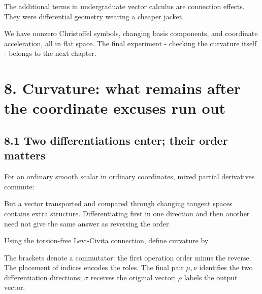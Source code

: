 \documentclass[
  11pt,
  letterpaper,
  oneside,
  openany]{scrbook}
\begin{document}
The additional terms in undergraduate vector calculus are connection
effects. They were differential geometry wearing a cheaper jacket.

We have nonzero Christoffel symbols, changing basis components, and
coordinate acceleration, all in flat space. The final experiment -
checking the curvature itself - belongs to the next chapter.

\hypertarget{chapter-8}{%
\chapter{8. Curvature: what remains after the coordinate excuses run
out}\label{chapter-8}}

\hypertarget{two-differentiations-enter-their-order-matters}{%
\section{8.1 Two differentiations enter; their order
matters}\label{two-differentiations-enter-their-order-matters}}

For an ordinary smooth scalar in ordinary coordinates, mixed partial
derivatives commute:

\begin{center}
\begingroup
{}
\ifdim\wd\grmathbox>\linewidth
\resizebox{\linewidth}{!}{\usebox{\grmathbox}}
\else\usebox{\grmathbox}\fi
\endgroup
\end{center}

But a vector transported and compared through changing tangent spaces
contains extra structure. Differentiating first in one direction and
then another need not give the same answer as reversing the order.

Using the torsion-free Levi-Civita connection, define curvature by

\begin{center}
\begingroup
{}
\ifdim\wd\grmathbox>\linewidth
\resizebox{\linewidth}{!}{\usebox{\grmathbox}}
\else\usebox{\grmathbox}\fi
\endgroup
\end{center}

The brackets denote a commutator: the first operation order minus the
reverse. The placement of indices encodes the roles. The final pair
\(\mu,\nu\) identifies the two differentiation directions; \(\sigma\)
receives the original vector; \(\rho\) labels the output vector.
\end{document}
